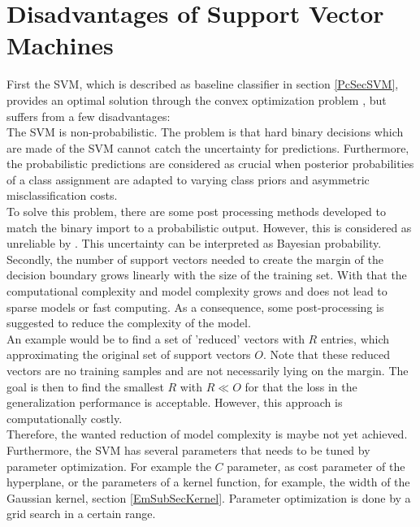 \section{Disadvantages of Support Vector Machines}\label{PcSecIdea}
First the \acs{SVM}, which is described as baseline classifier in section \ref{PcSecSVM}, provides an optimal solution through the convex optimization problem \cite[p. 325]{Bishop.2009}, but suffers from a few disadvantages:\\
The \acs{SVM} is non-probabilistic.
The problem is that hard binary decisions which are made of the \acs{SVM} cannot catch the uncertainty for predictions.
Furthermore, the probabilistic predictions are considered as crucial when posterior probabilities of a class assignment are adapted to varying class priors and asymmetric misclassification costs.\cite[p. 239-240]{Tipping.2001}\\
To solve this problem, there are some post processing methods developed to match the binary import to a probabilistic output.
However, this is considered as unreliable by \cite[p. 239-240]{Tipping.2001}. 
This uncertainty can be interpreted as Bayesian probability.\cite[p. 21]{Bishop.2009}\newline 
Secondly, the number of support vectors needed to create the margin of the decision boundary grows linearly with the size of the training set.
With that the computational complexity and model complexity grows and does not lead to sparse models or fast computing.
As a consequence, some post-processing is suggested to reduce the complexity of the model.\cite{Chen.2009}\\
An example would be to find a set of 'reduced' vectors with $R$ entries, which approximating the original set of support vectors $O$.
Note that these reduced vectors are no training samples and are not necessarily lying on the margin.
The goal is then to find the smallest $R$ with $R \ll O$ for that the loss in the generalization performance is acceptable.
However, this approach is computationally costly.\cite{Burges.1997}\\
Therefore, the wanted reduction of model complexity is maybe not yet achieved.\newline
Furthermore, the \ac{SVM} has several parameters that needs to be tuned by parameter optimization.
For example the $C$ parameter, as cost parameter of the hyperplane\cite[p. 420]{TrevorHastie.2009}, or the parameters of a kernel function, for example, the width of the Gaussian kernel, section \ref{EmSubSecKernel}.
Parameter optimization is done by a grid search in a certain range.
